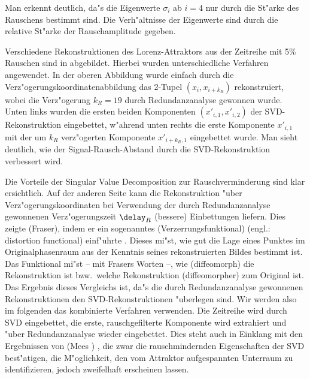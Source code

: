 Man erkennt deutlich, da"s die Eigenwerte $\sigma_i$ ab $i=4$ nur durch die St"arke des
Rauschens bestimmt sind. 
Die Verh"altnisse der Eigenwerte sind durch die relative St"arke der
Rauschamplitude gegeben. 

Verschiedene Rekonstruktionen des Lorenz-Attraktors aus der Zeitreihe mit 5\% Rauschen sind
in  abgebildet. Hierbei wurden unterschiedliche Verfahren angewendet.
In der oberen Abbildung wurde einfach durch die Verz"ogerungskoordinatenabbildung das 2-Tupel
$(x_i,x_{i+k_R})$ rekonstruiert, wobei die Verz"ogerung $k_R=19$ durch Redundanzanalyse
gewonnen wurde. Unten links wurden die ersten beiden Komponenten
$(x'_{i,1},x'_{i,2})$ der SVD-Rekonstruktion eingebettet, w"ahrend unten rechts die erste Komponente
$x'_{i,1}$ mit der um $k_R$ verz"ogerten Komponente $x'_{i+k_R,1}$ eingebettet wurde.
Man sieht deutlich, wie der Signal-Rausch-Abstand durch die SVD-Rekonstruktion verbessert
wird.


Die Vorteile der Singular Value Decomposition zur Rauschverminderung sind klar
ersichtlich. Auf der anderen Seite kann die Rekonstruktion "uber Verz"ogerungskoordinaten
bei Verwendung der durch Redundanzanalyse gewonnenen Verz"ogerungszeit $\delay_R$
\naja(bessere) Einbettungen liefern. Dies zeigte \autor(Fraser), indem er ein
sogenanntes \begriff(Verzerrungsfunktional) (engl.: distortion functional)
einf"uhrte \cite{Fraser}. Dieses mi"st, wie gut die Lage eines Punktes im Originalphasenraum aus der
Kenntnis seines rekonstruierten Bildes bestimmt ist. Das Funktional mi"st
-- mit Frasers Worten --, wie \naja(diffeomorph) die Rekonstruktion ist bzw.\  welche
Rekonstruktion \naja(diffeomorpher) zum Original ist. Das Ergebnis dieses Vergleichs ist,
da"s die durch Redundanzanalyse gewonnenen Rekonstruktionen den SVD-Rekonstruktionen
"uberlegen sind. Wir werden also im folgenden das kombinierte Verfahren verwenden. Die
Zeitreihe wird durch SVD eingebettet, die erste, rauschgefilterte Komponente wird
extrahiert und "uber Redundanzanalyse wieder eingebettet. Dies steht auch in Einklang mit
den Ergebnissen von \autor(Mees \etal) , die zwar die rauschmindernden
Eigenschaften der SVD best"atigen, die M"oglichkeit, den vom Attraktor aufgespannten
Unterraum zu identifizieren, jedoch zweifelhaft erscheinen lassen\cite{Mees87}.


